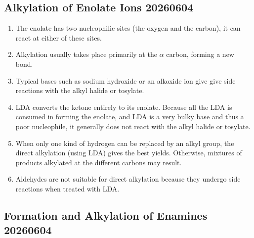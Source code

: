 \subsection{Alkylation of Enolate Ions 20260604}

\begin{enumerate}
    \item The enolate has two nucleophilic sites (the oxygen and the carbon), it can react at either of these sites.
    \item Alkylation usually takes place primarily at the $\alpha$ carbon, forming a new  bond.
    \item Typical bases such as sodium hydroxide or an alkoxide ion give give side reactions with the alkyl halide or tosylate. 
    \item LDA converts the ketone entirely to its enolate. Because all the LDA is consumed in forming the enolate, and LDA is a very bulky base and thus a poor nucleophile, it generally does not react with the alkyl halide or tosylate.
    \item When only one kind of hydrogen can be replaced by an alkyl group, the direct alkylation (using LDA) gives the best yields. Otherwise, mixtures of products alkylated at the different carbons may result.
    \item Aldehydes are not suitable for direct alkylation because they undergo side reactions when treated with LDA.
\end{enumerate}

\subsection{Formation and Alkylation of Enamines 20260604}

